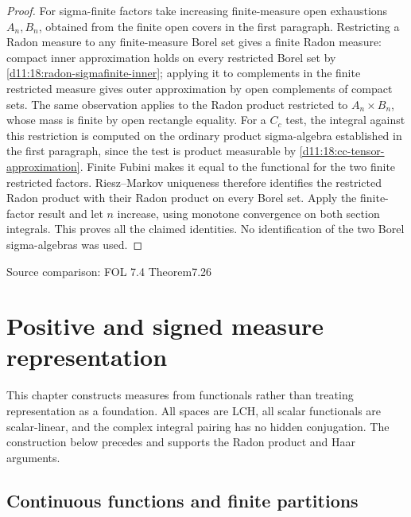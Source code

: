 \documentclass[11pt,oneside,openany]{book}
\theoremstyle{definition}
\theoremstyle{remark}
\newcounter{foundation}\renewcommand{\thefoundation}{F\arabic{foundation}}
\newcommand{\source}[1]{\par\begingroup\small\sffamily\color{black!65}Source comparison: #1\par\endgroup}
\begin{document}
\begin{proof}
\enlargethispage{2\baselineskip}
For sigma-finite factors take increasing finite-measure open exhaustions $A_n,B_n$, obtained from the finite open covers in the first paragraph. Restricting a Radon measure to any finite-measure Borel set gives a finite Radon measure: compact inner approximation holds on every restricted Borel set by \cref{d11:18:radon-sigmafinite-inner}; applying it to complements in the finite restricted measure gives outer approximation by open complements of compact sets. The same observation applies to the Radon product restricted to $A_n\times B_n$, whose mass is finite by open rectangle equality. For a $C_c$ test, the integral against this restriction is computed on the ordinary product sigma-algebra established in the first paragraph, since the test is product measurable by \cref{d11:18:cc-tensor-approximation}. Finite Fubini makes it equal to the functional for the two finite restricted factors. Riesz--Markov uniqueness therefore identifies the restricted Radon product with their Radon product on every Borel set. Apply the finite-factor result and let $n$ increase, using monotone convergence on both section integrals. This proves all the claimed identities. No identification of the two Borel sigma-algebras was used.
\end{proof}
\source{FOL 7.4 Theorem7.26}



\chapter{Positive and signed measure representation}\label{ch:d11-19}

This chapter constructs measures from functionals rather than treating representation as a foundation. All spaces are LCH, all scalar functionals are scalar-linear, and the complex integral pairing has no hidden conjugation. The construction below precedes and supports the Radon product and Haar arguments.

\section{Continuous functions and finite partitions}
\end{document}

